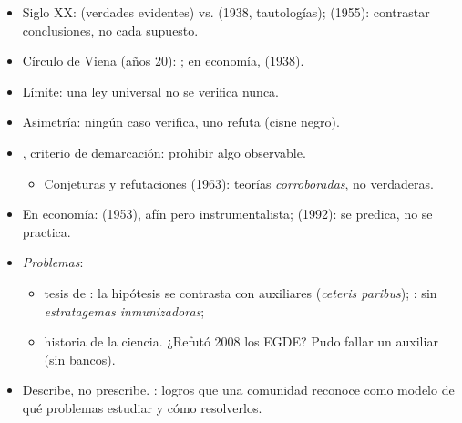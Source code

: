 \documentclass{article}
\begin{document}
\begin{columnas}
\begin{itemize}
  \begin{itemize}
  \item Deducción vs. inducción; individualismo vs. holismo. Puente: tipos ideales de  (1904).
  \end{itemize}
\item Siglo XX:  (verdades evidentes) vs.  (1938, tautologías);  (1955): contrastar conclusiones, no cada supuesto.
\end{itemize}
\begin{itemize}
\item Círculo de Viena (años 20): ; en economía,  (1938).
\item Límite: una ley universal no se verifica nunca.
\end{itemize}
\begin{itemize}
\item Asimetría: ningún caso verifica, uno refuta (cisne negro).
\item {}, criterio de demarcación: prohibir algo observable.
  \begin{itemize}
  \item Conjeturas y refutaciones (1963): teorías \emph{corroboradas}, no verdaderas.
  \end{itemize}
\item En economía:  (1953), afín pero instrumentalista;  (1992): se predica, no se practica.
\item \emph{Problemas}:
  \begin{itemize}
  \item tesis de : la hipótesis se contrasta con auxiliares (\emph{ceteris paribus}); : sin \emph{estratagemas inmunizadoras};
  \item historia de la ciencia. ¿Refutó 2008 los EGDE? Pudo fallar un auxiliar (sin bancos).
  \end{itemize}
\end{itemize}
\begin{itemize}
\item Describe, no prescribe. : logros que una comunidad reconoce como modelo de qué problemas estudiar y cómo resolverlos.
\end{itemize}

\end{columnas}
\end{document}
